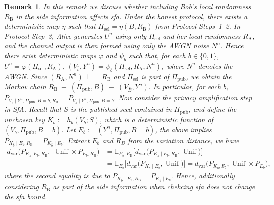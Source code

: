 \documentclass[onecolumn]{IEEEtran} %
\newcommand{\1}{\mathbbm{1}}
\theoremstyle{boldremark}
\newtheorem{remark}{Remark}
\DeclareMathOperator{\Unif}{Unif}
\newcommand{\pperp}{\mathrel{\perp\!\!\!\perp}}
\begin{document}
\begin{remark}\label{rem:RB_screening_SfA}
In this remark we discuss whether including Bob's local randomness \(R_{\mathrm B}\) in the side
information affects \gls{sfa}. Under the honest protocol, there exists a
deterministic map \(\eta\) such that $\Pi_{\mathrm{sel}}=\eta(B,R_{\mathrm B})$
from Protocol Steps~1--2. In Protocol Step~3, Alice generates \(U^n\) using only
\(\Pi_{\mathrm{sel}}\) and her local randomness \(R_{\mathrm A}\), and the
channel output is then formed using only the AWGN noise \(N^n\). Hence there
exist deterministic maps \(\varphi\) and \(\psi_b\) such that, for each
\(b\in\{0,1\}\), $U^n=\varphi(\Pi_{\mathrm{sel}},R_{\mathrm A}),\,
(V_{\bar b},Y^n)=\psi_b(\Pi_{\mathrm{sel}},R_{\mathrm A},N^n),$
where \(N^n\) denotes the AWGN. Since \((R_{\mathrm A},N^n)\pperp
R_{\mathrm B}\) and \(\Pi_{\mathrm{sel}}\) is part of \(\Pi_{\mathrm{pub}}\),
we obtain the Markov chain
$R_{\mathrm B}\;-\;(\Pi_{\mathrm{pub}},B)\;-\;(V_{\bar B},Y^n).$
In particular, for each \(b\), $P_{V_{\bar b}\mid Y^n,\Pi_{\mathrm{pub}},B=b,R_{\mathrm B}}
=P_{V_{\bar b}\mid Y^n,\Pi_{\mathrm{pub}},B=b}.$
Now consider the privacy amplification step in SfA. Recall that \(S\) is the published
seed contained in \(\Pi_{\mathrm{pub}}\), and define the unchosen key
\(K_{\bar b}:=h_{\bar b}(V_{\bar b};S)\), which is a deterministic function of
\((V_{\bar b},\Pi_{\mathrm{pub}},B=b)\). Let \(E_b:=(Y^n,\Pi_{\mathrm{pub}},B=b)\), the above implies $
P_{K_{\bar b}\mid E_b,R_{\mathrm B}}
=P_{K_{\bar b}\mid E_b}.$
Extract $E_b$ and $R_B$ from the variation distance, we have
\begin{align}
 d_{\mathrm{var}}\!\bigl(P_{K_{\bar b},E_b,R_{\mathrm B}},\;\Unif\times P_{E_b,R_{\mathrm B}}\bigr)
  &= \mathbb{E}_{E_b,R_{\mathrm B}}\!\Big[
    d_{\mathrm{var}}\!\bigl(P_{K_{\bar b}\mid E_b,R_{\mathrm B}},\Unif\bigr)\Big]\\
  &=
\mathbb{E}_{E_b}\!\Big[
d_{\mathrm{var}}\!\bigl(P_{K_{\bar b}\mid E_b},\Unif\bigr)
\Big]
=d_{\mathrm{var}}\!\bigl(P_{K_{\bar b},E_b},\Unif\times P_{E_b}\bigr),   
\end{align}
where the second equality is due to $P_{K_{\bar b}\mid E_b,R_{\mathrm B}}=P_{K_{\bar b}\mid E_b}.$
Hence, additionally considering \(R_{\mathrm B}\) as part of the side information when chekcing \gls{sfa} does not change the \gls{sfa} bound.
\end{remark}
\end{document}
